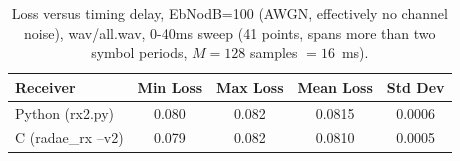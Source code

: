 \begin{table} [h]
\caption{Loss versus timing delay, EbNodB=100 (AWGN, effectively no channel noise), wav/all.wav, 0-40ms sweep (41 points, spans more than two symbol periods, $M=128$ samples $=16$~ms).}
\label{tab:delay_loss}
\centering
\begin{tabular}{ l | c | c | c | c }
 \hline
 Receiver & Min Loss & Max Loss & Mean Loss & Std Dev \\
 \hline
 Python (rx2.py)     & 0.080 & 0.082 & 0.0815 & 0.0006 \\
 C (radae\_rx --v2)  & 0.079 & 0.082 & 0.0810 & 0.0005 \\
 \hline
\end{tabular}
\end{table}
